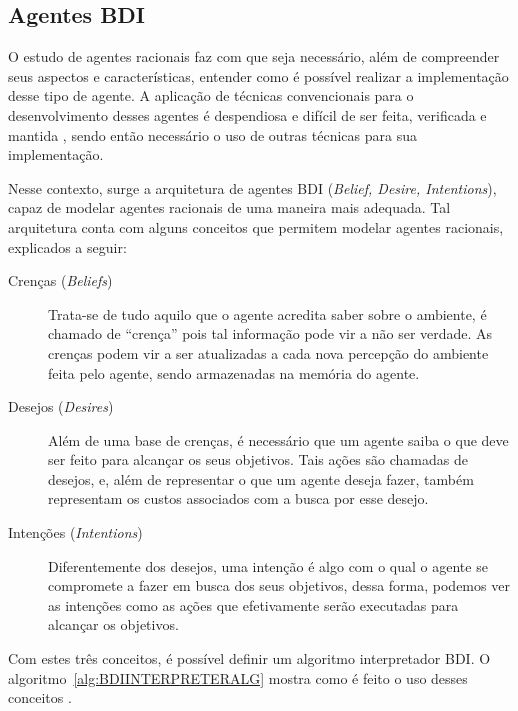 \subsection{Agentes BDI}
O estudo de agentes racionais faz com que seja necessário, além de compreender
seus aspectos e características, entender como é possível realizar a
implementação desse tipo de agente. A aplicação de técnicas convencionais para
o desenvolvimento desses agentes é despendiosa e difícil de ser feita,
verificada e mantida \cite{BDIFROMTHEORYTOPRACTICE}, sendo então necessário o
uso de outras técnicas para sua implementação.

Nesse contexto, surge a arquitetura de agentes BDI (\textit{Belief, Desire,
Intentions}), capaz de modelar agentes racionais de uma maneira mais adequada.
Tal arquitetura conta com alguns conceitos que permitem modelar agentes
racionais, explicados a seguir:

\begin{description} \item [Crenças (\textit{Beliefs})] Trata-se de tudo aquilo
que o agente acredita saber sobre o ambiente, é chamado de ``crença'' pois tal
informação pode vir a não ser verdade.  As crenças podem vir a ser atualizadas a
cada nova percepção do ambiente feita pelo agente, sendo armazenadas na memória
do agente.  \item [Desejos (\textit{Desires})] Além de uma base de crenças, é
	necessário que um agente saiba o que deve ser feito para alcançar os seus
	objetivos. Tais ações são chamadas de desejos, e, além de representar o que
	um agente deseja fazer, também representam os custos associados com a busca
	por esse desejo.  \item [Intenções (\textit{Intentions})] Diferentemente dos
	desejos, uma intenção é algo com o qual o agente se compromete a fazer em
	busca dos seus objetivos, dessa forma, podemos ver as intenções como as
	ações que efetivamente serão executadas para alcançar os objetivos.
	\end{description}

Com estes três conceitos, é possível definir um algoritmo interpretador BDI. O
algoritmo~\ref{alg:BDIINTERPRETERALG} mostra como é feito o uso desses conceitos
\cite{BDIFROMTHEORYTOPRACTICE}.


